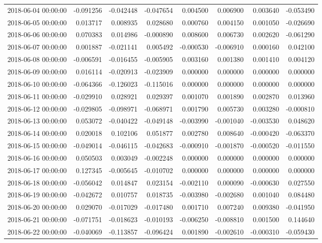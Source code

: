 \begin{tabular}{lrrrrrrr}
2018-06-04 00:00:00 & -0.091256 & -0.042448 & -0.047654 & 0.004500 & 0.006900 & 0.003640 & -0.053490 \\
2018-06-05 00:00:00 & 0.013717 & 0.008935 & 0.028680 & 0.000760 & 0.004150 & 0.001050 & -0.026690 \\
2018-06-06 00:00:00 & 0.070383 & 0.014986 & -0.000890 & 0.008600 & 0.006730 & 0.002620 & -0.061290 \\
2018-06-07 00:00:00 & 0.001887 & -0.021141 & 0.005492 & -0.000530 & -0.006910 & 0.000160 & 0.042100 \\
2018-06-08 00:00:00 & -0.006591 & -0.016455 & -0.005905 & 0.003160 & 0.001380 & 0.001410 & 0.004120 \\
2018-06-09 00:00:00 & 0.016114 & -0.020913 & -0.023909 & 0.000000 & 0.000000 & 0.000000 & 0.000000 \\
2018-06-10 00:00:00 & -0.064366 & -0.126023 & -0.115016 & 0.000000 & 0.000000 & 0.000000 & 0.000000 \\
2018-06-11 00:00:00 & -0.029910 & 0.028921 & 0.029397 & 0.001070 & 0.001890 & 0.002870 & 0.013960 \\
2018-06-12 00:00:00 & -0.029805 & -0.098971 & -0.068971 & 0.001790 & 0.005730 & 0.003280 & -0.000810 \\
2018-06-13 00:00:00 & 0.053072 & -0.040422 & -0.049148 & -0.003990 & -0.001040 & -0.003530 & 0.048620 \\
2018-06-14 00:00:00 & 0.020018 & 0.102106 & 0.051877 & 0.002780 & 0.008640 & -0.000420 & -0.063370 \\
2018-06-15 00:00:00 & -0.049014 & -0.046115 & -0.042683 & -0.000910 & -0.001870 & -0.000520 & -0.011550 \\
2018-06-16 00:00:00 & 0.050503 & 0.003049 & -0.002248 & 0.000000 & 0.000000 & 0.000000 & 0.000000 \\
2018-06-17 00:00:00 & 0.127345 & -0.005645 & -0.010702 & 0.000000 & 0.000000 & 0.000000 & 0.000000 \\
2018-06-18 00:00:00 & -0.056042 & 0.014847 & 0.023154 & -0.002110 & 0.000090 & -0.000630 & 0.027550 \\
2018-06-19 00:00:00 & -0.042672 & 0.010757 & 0.018735 & -0.003980 & -0.002680 & 0.001040 & 0.084480 \\
2018-06-20 00:00:00 & 0.029070 & -0.017029 & -0.017480 & 0.001710 & 0.007240 & 0.009380 & -0.041950 \\
2018-06-21 00:00:00 & -0.071751 & -0.018623 & -0.010193 & -0.006250 & -0.008810 & 0.001500 & 0.144640 \\
2018-06-22 00:00:00 & -0.040069 & -0.113857 & -0.096424 & 0.001890 & -0.002610 & -0.000310 & -0.059430 \\

\end{tabular}
